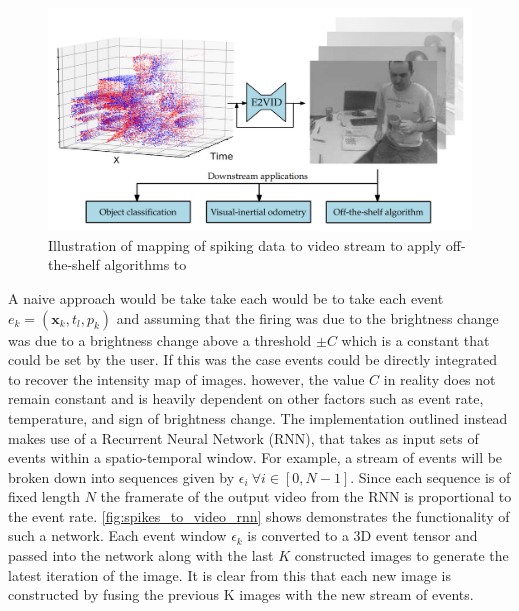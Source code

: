 \begin{figure}[htb]
      \centering
      \includegraphics[width=\textwidth]{background/images/spikes_to_video.png}
      \caption{Illustration of mapping of spiking data to video stream to apply off-the-shelf algorithms to\cite{spikingToVideo}}
      \label{fig:spikes_to_video}
\end{figure}

A naive approach would be take take each would be to take each event $ e_k = (\boldsymbol{\mathbf{x}}_k, t_l, p_k ) $ and assuming that the firing was due to the brightness change was due to a brightness change above a threshold $ \pm C $ which is a constant that could be set by the user. If this was the case events could be directly integrated to recover the intensity map of images. however, the value $ C $ in reality does not remain constant and is heavily dependent on other factors such as event rate, temperature, and sign of brightness change. The implementation outlined instead makes use of a Recurrent Neural Network (RNN), that takes as input sets of events within a spatio-temporal window. For example, a stream of events will be broken down into sequences given by $ \epsilon_i \: \forall i \in [0, N-1] $. Since each sequence is of fixed length $ N $ the framerate of the output video from the RNN is proportional to the event rate. \autoref{fig:spikes_to_video_rnn} shows demonstrates the functionality of such a network. Each event window $ \epsilon_k $ is converted to a 3D event tensor and passed into the network along with the last $ K $ constructed images to generate the latest iteration of the image. It is clear from this that each new image is constructed by fusing the previous K images with the new stream of events.

